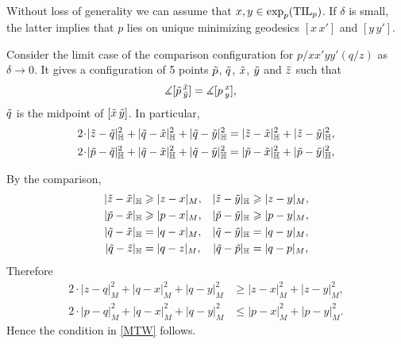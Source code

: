 Without loss of generality we can assume that $x,y\zz\in\exp_p(\TIL_p)$.
If $\delta$ is small, the latter implies that $p$ lies on unique minimizing geodesics $[x\,x']$ and $[y\,y']$.

Consider the limit case of the comparison configuration for $p/xx'yy'(q/z)$ as $\delta\to 0$.
It gives a configuration of 5 points $\~p$, $\~q$, $\~x$, $\~y$ and $\~z$ such that
\begin{align*}
\measuredangle[\~p\,^{\~x}_{\~y}]&=\measuredangle[p\,^x_y],
\end{align*}
$\~q$ is the midpoint of $[\~x\, \~y]$.
In particular,
\begin{align*}
2\cdot|\~z-\~q|_\HH^2+|\~q-\~x|_\HH^2+|\~q-\~y|_\HH^2
&=
|\~z-\~x|_\HH^2+|\~z-\~y|_\HH^2,
\\
2\cdot|\~p-\~q|_\HH^2+|\~q-\~x|_\HH^2+|\~q-\~y|_\HH^2
&=
|\~p-\~x|_\HH^2+|\~p-\~y|_\HH^2,
\end{align*}

By the comparison,
\begin{align*}
|\~z-\~x|_\HH&\ge |z-x|_M,
&
|\~z-\~y|_\HH&\ge |z-y|_M,
\\
|\~p-\~x|_\HH&\ge |p-x|_M,
&
|\~p-\~y|_\HH&\ge |p-y|_M,
\\
|\~q-\~x|_\HH&= |q-x|_M,
&
|\~q-\~y|_\HH&= |q-y|_M,
\\
|\~q-\~z|_\HH&= |q-z|_M,
&
|\~q-\~p|_\HH&= |q-p|_M,
\end{align*}
Therefore
\begin{align*}
2\cdot|z-q|_M^2+|q-x|_M^2+|q-y|_M^2
&\ge
|z-x|_M^2+|z-y|_M^2,
\\
2\cdot|p-q|_M^2+|q-x|_M^2+|q-y|_M^2
&\le
|p-x|_M^2+|p-y|_M^2.
\end{align*}
Hence the condition in \ref{MTW} follows.
\qeds


